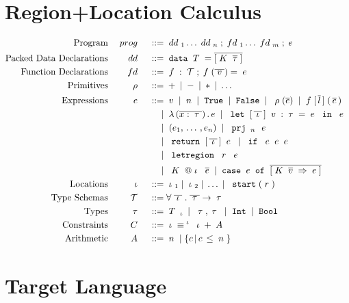 \documentclass[12pt]{article}
\makeatletter
\newcommand{\gramdef}{\; ::= \;}
\newcommand{\gramor}{\; | \;}
\newcommand{\PROG}{\keywd{prog}}
\newcommand{\EXPR}{\keywd{e}}
\newcommand{\PRIM}{\keywd{\rho}}
\newcommand{\TYP}{\keywd{\tau}}
\newcommand{\STYP}{\keywd{\mathcal{T}}}
\newcommand{\DD}{\keywd{dd}}
\newcommand{\VD}{\keywd{vd}}
\newcommand{\FD}{\keywd{fd}}
\newcommand{\TC}{\keywd{T}}
\newcommand{\DC}{\keywd{K}}
\newcommand{\DATA}{\gramwd{data}}
\newcommand{\sTYP}{\skeywd{\tau}}
\newcommand{\sEXPR}{\skeywd{e}}
\newcommand{\skeywd}[1]{#1}
\newcommand{\keywd}[1]{\; {#1} \;}
\newcommand{\gramwd}[1]{\; \texttt{#1} \;}
\newcommand{\pairtype}[2]{\; {#1}, {#2} \;}
\newcommand{\case}[2]{\gramwd{case}\; #1\; \gramwd{of}\; #2 \;}
\newcommand{\bind}[2]{{#1} \Rightarrow {#2}}
\newcommand{\var}{\; \svar \;}
\newcommand{\svar}{v}
\newcommand{\fvar}{\; \sfvar \;}
\newcommand{\sfvar}{f}
\newcommand{\num}{\; n \;}
\newcommand{\primexpr}[1]{\; \PRIM(#1) \;}
\newcommand{\ife}[3]{\; \gramwd{if}\; #1 #2 #3 \;}
\newcommand{\mapp}[3]{\; #1\;[\,#2\,]\;(\,#3\,) \;}
\newcommand{\return}[2]{\; \gramwd{return}\;[\,#1\,]\;#2\;}
\newcommand{\project}[2]{\; \gramwd{prj}_{#1}\,{#2}\;}
\newcommand{\anonfun}[2]{\; \lambda\,(#1)\,.\,#2\;}
\newcommand{\letlexpr}[4]{\;\gramwd{let} \; [\,#1\,]\; #2 = #3 \; \gramwd{in} \; #3 \;}
\newcommand{\letregion}[2]{\; \gramwd{letregion}\;#1\;#2 \;}
\newcommand{\mkdata}[3]{\; #1\;#2\;\;#3 \;}
\newcommand{\LOC}{\keywd{\iota}}
\newcommand{\REG}{\keywd{r}}
\newcommand{\atloc}[1]{@#1}
\newcommand{\lstart}[1]{\; \gramwd{start}(#1) \;}
\newcommand{\CONSTR}{\keywd{C}}
\newcommand{\A}{\keywd{A}}
\makeatother
\begin{document}
\section{Region+Location Calculus}

\begin{displaymath}
  \begin{aligned}
      \textup{Program} && \PROG && \gramdef & \DD_1 \ldots \DD_n \; ; 
                          \FD_1 \ldots \FD_m \; ; \EXPR \\
      \textup{Packed Data Declarations} && \DD && \gramdef & \DATA \TC = \overline{[\DC \; \overline{\sTYP}\;]} \\    
      \textup{Function Declarations} && \FD && \gramdef & \fvar : \STYP ; \fvar(\overline{\var}) = \EXPR \\
      \textup{Primitives} && \PRIM && \gramdef & + \gramor - \gramor * \gramor \ldots \\
      \textup{Expressions} && \EXPR && \gramdef & \var \gramor \num \gramor \gramwd{True} \gramor \gramwd{False} \gramor
            \primexpr{\overline{\sEXPR}} \gramor \mapp{f}{\overline{l}}{\overline{e}} \\
      && && \gramor & \anonfun{\overline{x : \TYP}}{e} \gramor \letlexpr{\overline{\LOC}}{\var:\TYP}{\EXPR}{\EXPR} \\
      && && \gramor & \;(e_1,\, \dots\, , e_n)\; \gramor \project{\num}{\EXPR} \\
      && && \gramor & \return{\overline{\LOC}}{\EXPR} \gramor \ife{\EXPR}{\EXPR}{\EXPR} \\
      && && \gramor & \letregion{\REG}{\EXPR} \\
      && && \gramor & \mkdata{\DC}{\atloc{\LOC}}{\overline{e}} \gramor \case{\sEXPR}{\overline{[\bind{\DC \; \overline{\svar} \;}{\EXPR}]}} \\
      \textup{Locations} && \LOC && \gramdef & \LOC_1 \gramor \LOC_2 \gramor \ldots \gramor \lstart{\REG} \\
      \textup{Type Schemas} && \STYP && \gramdef & \forall\;\overline{\LOC}\;.\;\overline{\TYP}\rightarrow\TYP \\
      \textup{Types} && \TYP && \gramdef & \TC_{\LOC} \gramor \pairtype{\TYP}{\TYP} \gramor \gramwd{Int} \gramor \gramwd{Bool} \\
      \textup{Constraints} && \CONSTR && \gramdef & \LOC \equiv^{\LOC} \LOC + \A \\
      \textup{Arithmetic} && \A && \gramdef & \num \gramor \{ c\, |\, c \, \leq \num \}
  \end{aligned}
\end{displaymath}

\section{Target Language}
\end{document}
